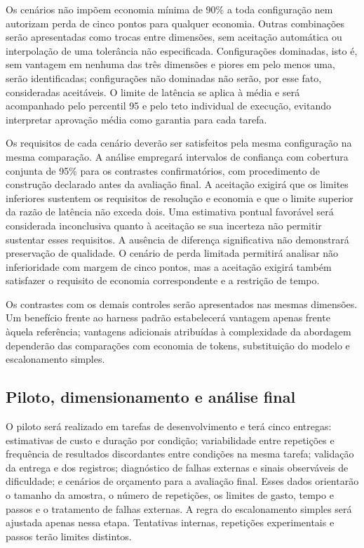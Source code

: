 Os cenários não impõem economia mínima de 90\% a toda configuração nem autorizam perda de cinco pontos para qualquer economia. Outras combinações serão apresentadas como trocas entre dimensões, sem aceitação automática ou interpolação de uma tolerância não especificada. Configurações dominadas, isto é, sem vantagem em nenhuma das três dimensões e piores em pelo menos uma, serão identificadas; configurações não dominadas não serão, por esse fato, consideradas aceitáveis. O limite de latência se aplica à média e será acompanhado pelo percentil 95 e pelo teto individual de execução, evitando interpretar aprovação média como garantia para cada tarefa.

Os requisitos de cada cenário deverão ser satisfeitos pela mesma configuração na mesma comparação. A análise empregará intervalos de confiança com cobertura conjunta de 95\% para os contrastes confirmatórios, com procedimento de construção declarado antes da avaliação final. A aceitação exigirá que os limites inferiores sustentem os requisitos de resolução e economia e que o limite superior da razão de latência não exceda dois. Uma estimativa pontual favorável será considerada inconclusiva quanto à aceitação se sua incerteza não permitir sustentar esses requisitos. A ausência de diferença significativa não demonstrará preservação de qualidade. O cenário de perda limitada permitirá analisar não inferioridade com margem de cinco pontos, mas a aceitação exigirá também satisfazer o requisito de economia correspondente e a restrição de tempo.

Os contrastes com os demais controles serão apresentados nas mesmas dimensões. Um benefício frente ao harness padrão estabelecerá vantagem apenas frente àquela referência; vantagens adicionais atribuídas à complexidade da abordagem dependerão das comparações com economia de tokens, substituição do modelo e escalonamento simples.

\subsection{Piloto, dimensionamento e análise final}

O piloto será realizado em tarefas de desenvolvimento e terá cinco entregas: estimativas de custo e duração por condição; variabilidade entre repetições e frequência de resultados discordantes entre condições na mesma tarefa; validação da entrega e dos registros; diagnóstico de falhas externas e sinais observáveis de dificuldade; e cenários de orçamento para a avaliação final. Esses dados orientarão o tamanho da amostra, o número de repetições, os limites de gasto, tempo e passos e o tratamento de falhas externas. A regra do escalonamento simples será ajustada apenas nessa etapa. Tentativas internas, repetições experimentais e passos terão limites distintos.

